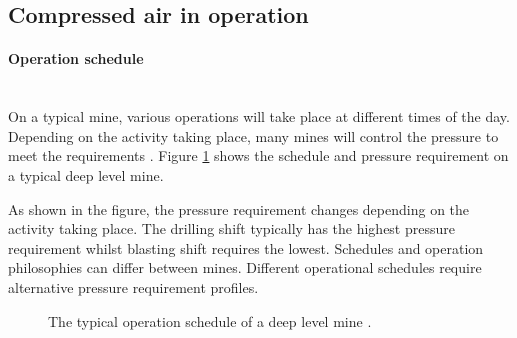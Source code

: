 \subsection{Compressed air in operation}
	\paragraph{Operation schedule}\leavevmode\\
	On a typical mine, various operations will take place at different times of the day. Depending on the activity taking place, many mines will control the pressure to meet the requirements \cite{Kriel2014Masters,Marais2012PhD}. Figure \ref{fig: Mining schedule} shows the schedule and pressure requirement on a typical deep level mine.\par 
	As shown in the figure, the pressure requirement changes depending on the activity taking place. The drilling shift typically has the highest pressure requirement whilst blasting shift requires the lowest. Schedules and operation philosophies can differ between mines. Different operational schedules require alternative pressure requirement profiles.
		\begin{figure}[h]
		\centering
		\fbox{}
		\caption[A typical operation schedule of a deep level mine.]{The typical operation schedule of a deep level mine \cite{Kriel2014Masters}.}
		\label{fig: Mining schedule}
	\end{figure}

